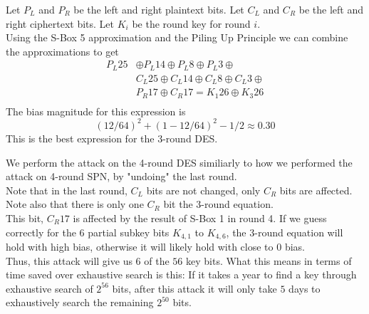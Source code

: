 \documentclass[9pt]{beamer}
\begin{document}
\begin{frame}
Let $P_L$ and $P_R$ be the left and right plaintext bits. Let $C_L$ and $C_R$ be the left and right ciphertext bits. Let $K_i$ be the round key for round $i$. \\
\vspace{5mm}
Using the S-Box 5 approximation and the Piling Up Principle we can combine the approximations to get
\begin{align*}
 P_L{25} & \oplus P_L{14} \oplus P_L{8} \oplus P_L{3} \oplus \\
         & C_L{25} \oplus C_L{14} \oplus C_L{8} \oplus C_L{3} \oplus \\
			& P_R{17} \oplus C_R{17} = K_1{26} \oplus K_3{26} \\
\end{align*}
The bias magnitude for this expression is
\[ (12/64)^2 + (1 - 12/64)^2 - 1/2 \approx 0.30 \]
This is the best expression for the 3-round DES.
\end{frame}

\begin{frame}
We perform the attack on the 4-round DES similiarly to how we performed the attack on 4-round SPN, by "undoing" the last round.\\
\vspace{5mm}
\pause
Note that in the last round, $C_L$ bits are not changed, only $C_R$ bits are affected. Note also that there is only one $C_R$ bit the 3-round equation.\\
\vspace{5mm}
\pause
This bit, $C_R{17}$ is affected by the result of S-Box 1 in round 4. If we guess correctly for the 6 partial subkey bits $K_{4,1}$ to $K_{4,6}$, the 3-round equation will hold with high bias, otherwise it will likely hold with close to 0 bias.\\
\vspace{5mm}
\pause
Thus, this attack will give us $6$ of the $56$ key bits. What this means in terms of time saved over exhaustive search is this: If it takes a year to find a key through exhaustive search of $2^{56}$ bits, after this attack it will only take $5$ days to exhaustively search the remaining $2^{50}$ bits.
\end{frame}
\end{document}
